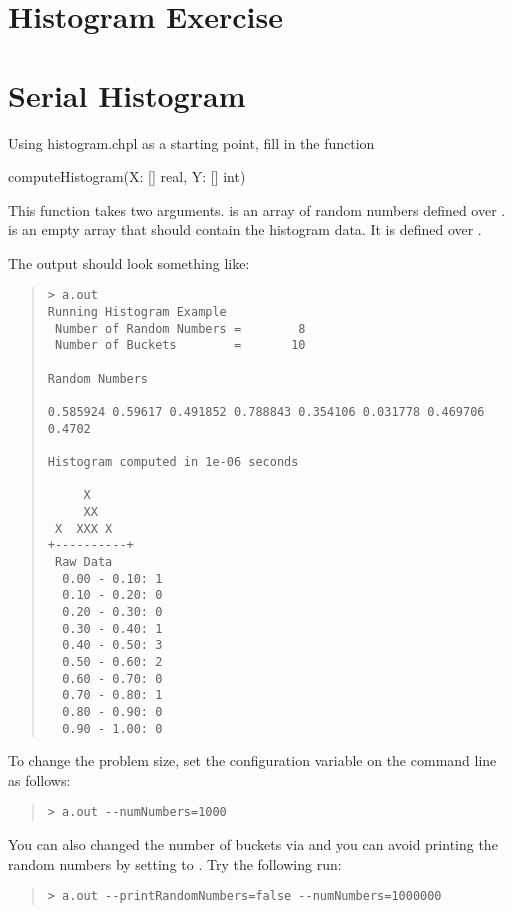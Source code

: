 \documentclass[10pt]{article}
\begin{document}
\lstset{language=chapel}

\section*{Histogram Exercise}

\section{Serial Histogram}
Using histogram.chpl as a starting point, fill in the function
\begin{chapel}
computeHistogram(X: [] real, Y: [] int)
\end{chapel}
This function takes two arguments.   is an array of random
numbers defined over .   is an empty array
that should contain the histogram data.  It is defined over
.

The output should look something like:
\begin{quote}
\begin{footnotesize}
\begin{verbatim}
> a.out
Running Histogram Example
 Number of Random Numbers =        8
 Number of Buckets        =       10

Random Numbers

0.585924 0.59617 0.491852 0.788843 0.354106 0.031778 0.469706 0.4702

Histogram computed in 1e-06 seconds

     X     
     XX    
 X  XXX X  
+----------+
 Raw Data
  0.00 - 0.10: 1
  0.10 - 0.20: 0
  0.20 - 0.30: 0
  0.30 - 0.40: 1
  0.40 - 0.50: 3
  0.50 - 0.60: 2
  0.60 - 0.70: 0
  0.70 - 0.80: 1
  0.80 - 0.90: 0
  0.90 - 1.00: 0
\end{verbatim}
\end{footnotesize}
\end{quote}

To change the problem size, set the configuration variable on the
command line as follows:
\begin{quote}
\begin{footnotesize}
\begin{verbatim}
> a.out --numNumbers=1000
\end{verbatim}
\end{footnotesize}
\end{quote}
You can also changed the number of buckets via  and
you can avoid printing the random numbers by setting
 to .  Try the following run:
\begin{quote}
\begin{footnotesize}
\begin{verbatim}
> a.out --printRandomNumbers=false --numNumbers=1000000
\end{verbatim}
\end{footnotesize}
\end{quote}
\end{document}
